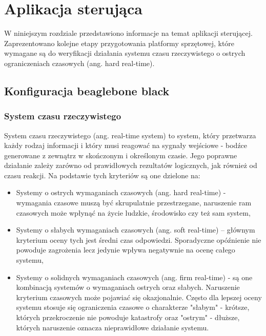 \chapter{Aplikacja sterująca}
\label{cha:aplikacja_sterujaca}
W niniejszym rozdziale przedstawiono informacje na temat aplikacji sterującej. Zaprezentowano kolejne etapy przygotowania platformy sprzętowej, które wymagane są do weryfikacji działania systemu czasu rzeczywistego o ostrych ograniczeniach czasowych (ang. hard real-time).

\section{Konfiguracja beaglebone black}

\subsection{System czasu rzeczywistego}
System czasu rzeczywistego (ang. real-time system) to system, który przetwarza każdy rodzaj informacji i który musi reagować na sygnały wejściowe - bodźce generowane z zewnątrz w skończonym i określonym czasie. Jego poprawne działanie zależy zarówno od prawidłowych rezultatów logicznych, jak również od czasu reakcji.
Na podstawie tych kryteriów są one dzielone na:
\begin{itemize}
	\item Systemy o ostrych wymaganiach czasowych (ang. hard real-time) - wymagania czasowe muszą być skrupulatnie przestrzegane, naruszenie ram czasowych może wpłynąć na życie ludzkie, środowisko czy też sam system,
 
	\item Systemy o słabych wymaganiach czasowych (ang. soft real-time) – głównym kryterium oceny tych jest średni czas odpowiedzi. Sporadyczne opóźnienie nie powoduje zagrożenia lecz jedynie wpływa negatywnie na ocenę całego systemu,

	\item Systemy o solidnych wymaganiach czasowych (ang. firm real-time) - są one kombinacją systemów o wymaganiach ostrych oraz słabych. Naruszenie kryterium czasowych może pojawiać się okazjonalnie. Często dla lepszej oceny systemu stosuje się ograniczenia czasowe o charakterze "słabym" - krótsze, których przekroczenie nie powoduje katastrofy oraz "ostrym" - dłuższe, których naruszenie oznacza nieprawidłowe działanie systemu. 

\end{itemize}

